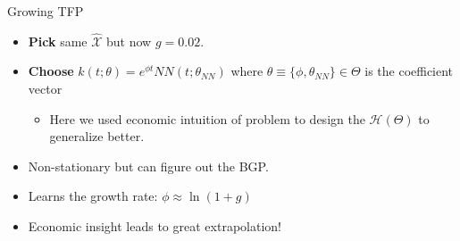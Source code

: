 \documentclass[aspectratio=169,10pt]{beamer}
\newcommand{\emphcolor}[1]{\textbf{\textcolor{emphcolorval}{#1}}}
\newcommand{\Xtrain}{\hat{\mathcal{X}}}
\begin{document}
\begin{frame}[label = TFP_seq_ncg]{Growing TFP}
	\begin{minipage}[t]{0.4\textwidth}
	\end{minipage}
	\hfill%
	\begin{minipage}[t]{0.5\textwidth}\raggedleft
		\begin{itemize}
			\item \emphcolor{Pick} same $\Xtrain$ but now $g = 0.02$.
			\item \emphcolor{Choose} $k(t;\theta) = e^{\phi t} NN(t;\theta_{NN})$ where $\theta \equiv \{\phi,\theta_{NN}\}\in\Theta$ is the coefficient vector
			\begin{itemize}
				\item Here we used economic intuition of problem to design the $\mathcal{H}(\Theta)$ to generalize better.
			\end{itemize}
			\item Non-stationary but can figure out the BGP.
			\item  Learns the growth rate: $\phi \approx \ln(1+g)$ 
			\item Economic insight leads to great extrapolation!
		\end{itemize}
	\end{minipage} 
\end{frame}
\end{document}
